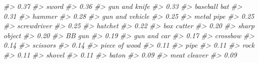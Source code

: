 \documentclass[
  12pt,
  openany]{book}
\newenvironment{Shaded}{\begin{snugshade}}{\end{snugshade}}
\newcommand{\CommentTok}[1]{\textcolor[rgb]{0.37,0.37,0.37}{\textit{#1}}}
\begin{document}
\begin{Shaded}
\begin{Highlighting}[]
\CommentTok{\#\textgreater{}                             0.37 }
\CommentTok{\#\textgreater{}                            sword }
\CommentTok{\#\textgreater{}                             0.36 }
\CommentTok{\#\textgreater{}                    gun and knife }
\CommentTok{\#\textgreater{}                             0.33 }
\CommentTok{\#\textgreater{}                     baseball bat }
\CommentTok{\#\textgreater{}                             0.31 }
\CommentTok{\#\textgreater{}                           hammer }
\CommentTok{\#\textgreater{}                             0.28 }
\CommentTok{\#\textgreater{}                  gun and vehicle }
\CommentTok{\#\textgreater{}                             0.25 }
\CommentTok{\#\textgreater{}                       metal pipe }
\CommentTok{\#\textgreater{}                             0.25 }
\CommentTok{\#\textgreater{}                      screwdriver }
\CommentTok{\#\textgreater{}                             0.25 }
\CommentTok{\#\textgreater{}                          hatchet }
\CommentTok{\#\textgreater{}                             0.22 }
\CommentTok{\#\textgreater{}                       box cutter }
\CommentTok{\#\textgreater{}                             0.20 }
\CommentTok{\#\textgreater{}                     sharp object }
\CommentTok{\#\textgreater{}                             0.20 }
\CommentTok{\#\textgreater{}                           BB gun }
\CommentTok{\#\textgreater{}                             0.19 }
\CommentTok{\#\textgreater{}                      gun and car }
\CommentTok{\#\textgreater{}                             0.17 }
\CommentTok{\#\textgreater{}                         crossbow }
\CommentTok{\#\textgreater{}                             0.14 }
\CommentTok{\#\textgreater{}                         scissors }
\CommentTok{\#\textgreater{}                             0.14 }
\CommentTok{\#\textgreater{}                    piece of wood }
\CommentTok{\#\textgreater{}                             0.11 }
\CommentTok{\#\textgreater{}                             pipe }
\CommentTok{\#\textgreater{}                             0.11 }
\CommentTok{\#\textgreater{}                             rock }
\CommentTok{\#\textgreater{}                             0.11 }
\CommentTok{\#\textgreater{}                           shovel }
\CommentTok{\#\textgreater{}                             0.11 }
\CommentTok{\#\textgreater{}                            baton }
\CommentTok{\#\textgreater{}                             0.09 }
\CommentTok{\#\textgreater{}                     meat cleaver }
\CommentTok{\#\textgreater{}                             0.09 }

\end{Highlighting}
\end{Shaded}
\end{document}
